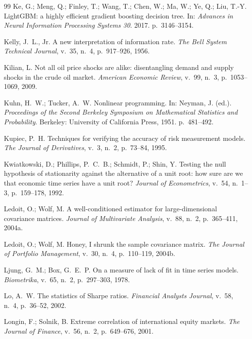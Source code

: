 \begin{thebibliography}{99}
Ke, G.; Meng, Q.; Finley, T.; Wang, T.; Chen, W.; Ma, W.; Ye, Q.; Liu, T.-Y. LightGBM: a highly efficient gradient boosting decision tree. In: \emph{Advances in Neural Information Processing Systems 30}. 2017. p.~3146--3154.

Kelly, J.~L., Jr. A new interpretation of information rate. \emph{The Bell System Technical Journal}, v.~35, n.~4, p.~917--926, 1956.

Kilian, L. Not all oil price shocks are alike: disentangling demand and supply shocks in the crude oil market. \emph{American Economic Review}, v.~99, n.~3, p.~1053--1069, 2009.

Kuhn, H.~W.; Tucker, A.~W. Nonlinear programming. In: Neyman, J. (ed.). \emph{Proceedings of the Second Berkeley Symposium on Mathematical Statistics and Probability}. Berkeley: University of California Press, 1951. p.~481--492.

Kupiec, P.~H. Techniques for verifying the accuracy of risk measurement models. \emph{The Journal of Derivatives}, v.~3, n.~2, p.~73--84, 1995.

Kwiatkowski, D.; Phillips, P.~C.~B.; Schmidt, P.; Shin, Y. Testing the null hypothesis of stationarity against the alternative of a unit root: how sure are we that economic time series have a unit root? \emph{Journal of Econometrics}, v.~54, n.~1--3, p.~159--178, 1992.

Ledoit, O.; Wolf, M. A well-conditioned estimator for large-dimensional covariance matrices. \emph{Journal of Multivariate Analysis}, v.~88, n.~2, p.~365--411, 2004a.

Ledoit, O.; Wolf, M. Honey, I shrunk the sample covariance matrix. \emph{The Journal of Portfolio Management}, v.~30, n.~4, p.~110--119, 2004b.

Ljung, G.~M.; Box, G.~E.~P. On a measure of lack of fit in time series models. \emph{Biometrika}, v.~65, n.~2, p.~297--303, 1978.

Lo, A.~W. The statistics of Sharpe ratios. \emph{Financial Analysts Journal}, v.~58, n.~4, p.~36--52, 2002.

Longin, F.; Solnik, B. Extreme correlation of international equity markets. \emph{The Journal of Finance}, v.~56, n.~2, p.~649--676, 2001.


\end{thebibliography}
